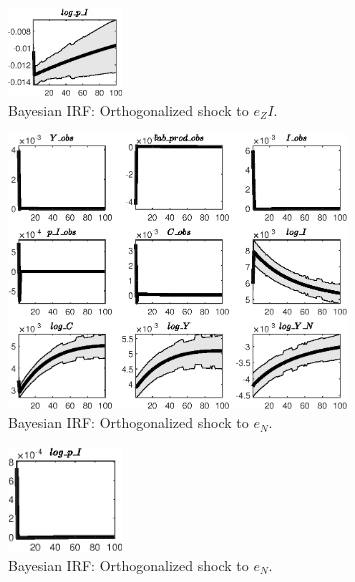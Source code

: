 \begin{figure}[H]
\centering 
\includegraphics[width=0.27\textwidth]{BRS_growth_alt/Output/BRS_growth_alt_Bayesian_IRF_e_ZI_2}
\caption{Bayesian IRF: Orthogonalized shock to ${e_ZI}$.}
\label{Fig:BayesianIRF:e_ZI:2}
\end{figure}
 
\begin{figure}[H]
\centering 
\includegraphics[width=0.80\textwidth]{BRS_growth_alt/Output/BRS_growth_alt_Bayesian_IRF_e_N_1}
\caption{Bayesian IRF: Orthogonalized shock to ${e_N}$.}
\label{Fig:BayesianIRF:e_N:1}
\end{figure}
 
\begin{figure}[H]
\centering 
\includegraphics[width=0.27\textwidth]{BRS_growth_alt/Output/BRS_growth_alt_Bayesian_IRF_e_N_2}
\caption{Bayesian IRF: Orthogonalized shock to ${e_N}$.}
\label{Fig:BayesianIRF:e_N:2}
\end{figure}
 
